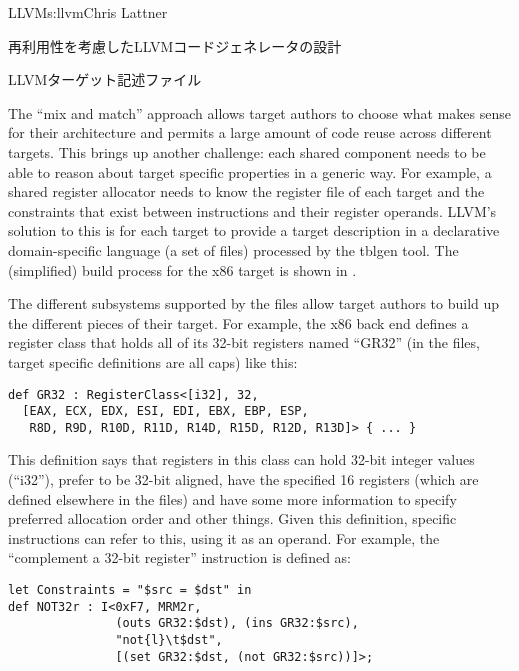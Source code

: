 \begin{aosachapter}{LLVM}{s:llvm}{Chris Lattner}
\begin{aosasect1}{再利用性を考慮したLLVMコードジェネレータの設計}
\begin{aosasect2}{LLVMターゲット記述ファイル}

The ``mix and match'' approach allows target authors to choose what
makes sense for their architecture and permits a large amount of code
reuse across different targets.  This brings up another challenge:
each shared component needs to be able to reason about target specific
properties in a generic way. For example, a shared register allocator
needs to know the register file of each target and the constraints
that exist between instructions and their register operands.  LLVM's
solution to this is for each target to provide a target description in
a declarative domain-specific language (a set of  files)
processed by the tblgen tool.  The (simplified) build process for the
x86 target is shown in .


The different subsystems supported by the  files allow
target authors to build up the different pieces of their target. For
example, the x86 back end defines a register class that holds all of
its 32-bit registers named ``GR32'' (in the  files, target
specific definitions are all caps) like this:

\begin{verbatim}
def GR32 : RegisterClass<[i32], 32,
  [EAX, ECX, EDX, ESI, EDI, EBX, EBP, ESP,
   R8D, R9D, R10D, R11D, R14D, R15D, R12D, R13D]> { ... }
\end{verbatim}

\noindent This definition says that registers in this class can hold 32-bit
integer values (``i32''), prefer to be 32-bit aligned, have the
specified 16 registers (which are defined elsewhere in the 
files) and have some more information to specify preferred allocation
order and other things.  Given this definition, specific instructions
can refer to this, using it as an operand.  For example, the
``complement a 32-bit register'' instruction is defined as:

\begin{verbatim}
let Constraints = "$src = $dst" in
def NOT32r : I<0xF7, MRM2r,
               (outs GR32:$dst), (ins GR32:$src),
               "not{l}\t$dst",
               [(set GR32:$dst, (not GR32:$src))]>;
\end{verbatim}


\end{aosasect2}
\end{aosasect1}
\end{aosachapter}
